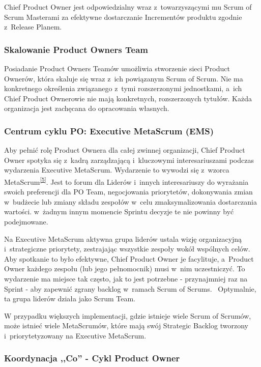 \documentclass[12pt,a4paper,parskip=full]{scrartcl}
\begin{document}
Chief Product Owner jest odpowiedzialny wraz z~towarzyszącymi mu Scrum of Scrum Masterami za efektywne dostarczanie Incrementów produktu zgodnie z~Release Planem.

\subsubsection{Skalowanie Product Owners Team}\label{scaling-the-product-owner-team}

Posiadanie Product Owners Teamów umożliwia stworzenie sieci Product Ownerów, która skaluje się wraz z~ich powiązanym Scrum of Scrum. Nie ma konkretnego określenia związanego z~tymi rozszerzonymi jednostkami, a~ich Chief Product Ownerowie nie mają konkretnych, rozszerzonych tytułów. Każda organizacja jest zachęcana do opracowania własnych.

\subsubsection{Centrum cyklu PO: Executive MetaScrum (EMS)}\label{the-hub-of-the-po-cycle}

Aby pełnić rolę Product Ownera dla całej zwinnej organizacji, Chief Product Owner spotyka się z~kadrą zarządzającą i~kluczowymi interesariuszami podczas wydarzenia Executive MetaScrum. Wydarzenie to wywodzi się z~wzorca MetaScrum\textsuperscript{\ref{5}}. Jest to forum dla Liderów i~innych interesariuszy do wyrażania swoich preferencji dla PO Team, negocjowania priorytetów, dokonywania zmian w~budżecie lub zmiany składu zespołów w~celu zmaksymalizowania dostarczania wartości. w~żadnym innym momencie Sprintu decyzje te nie powinny być podejmowane.

Na Executive MetaScrum aktywna grupa liderów ustala wizję organizacyjną i~strategiczne priorytety, zestrajając wszystkie zespoły wokół wspólnych celów. Aby spotkanie to było efektywne, Chief Product Owner je facylituje, a~Product Owner każdego zespołu (lub jego pełnomocnik) musi w~nim uczestniczyć. To wydarzenie ma miejsce tak często, jak to jest potrzebne - przynajmniej raz na Sprint - aby zapewnić zgrany backlog w~ramach Scrum of Scrums.~ Optymalnie, ta grupa liderów działa jako Scrum Team.

W przypadku większych implementacji, gdzie istnieje wiele Scrum of Scrumów, może istnieć wiele MetaScrumów, które mają swój Strategic Backlog tworzony i~priorytetyzowany na Executive MetaScrum.

\subsubsection{Koordynacja ,,Co'' - Cykl Product Owner}\label{coordinating-the-what}
\end{document}
